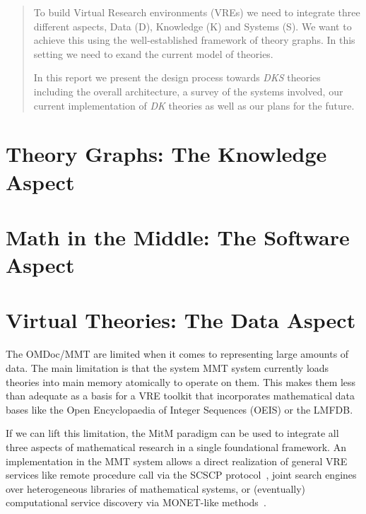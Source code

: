 \documentclass{../../Proposal/LaTeX-proposal/deliverablereport}
\author{Michael Kohlhase, Florian Rabe, Tom Wiesing, Paul-Olivier Dehaye}
\newcommand{\MMT}{MMT\xspace}
\begin{document}
\begin{abstract}
  To build Virtual Research environments (VREs) we need to integrate three different aspects, Data (D), Knowledge (K) and Systems (S). We want to achieve this using the well-established framework of theory graphs. In this setting we need to exand the current model of theories.

  In this report we present the design process towards \textit{DKS} theories including the overall architecture, a survey of the systems involved, our current implementation of \textit{DK} theories as well as our plans for the future.
\end{abstract}
\maketitle 


\newpage\tableofcontents\newpage




\section{Theory Graphs: The Knowledge Aspect}\label{sec:MMT}
 
 
\section{Math in the Middle: The Software Aspect}\label{sec:mitm}
  
  
\section{Virtual Theories: The Data Aspect}\label{sec:data}
The OMDoc/MMT are limited when it comes to representing large amounts of data. The main
limitation is that the system \MMT system currently loads theories into main memory
atomically to operate on them. This makes them less than adequate as a basis for a VRE
toolkit that incorporates mathematical data bases like the Open Encyclopaedia of Integer
Sequences (OEIS) or the LMFDB.

If we can lift this limitation, the MitM paradigm can be used to integrate all three
aspects of mathematical research in a single foundational framework. An implementation in
the MMT system allows a direct realization of general VRE services like remote procedure
call via the SCSCP protocol~\cite{SCSCP,FHKLR:SCSCP08,HorRoz:ossp09}, joint search engines
over heterogeneous libraries of mathematical systems, or (eventually) computational
service discovery via MONET-like methods~\cite{aird-et-al:2005}.
\end{document}

